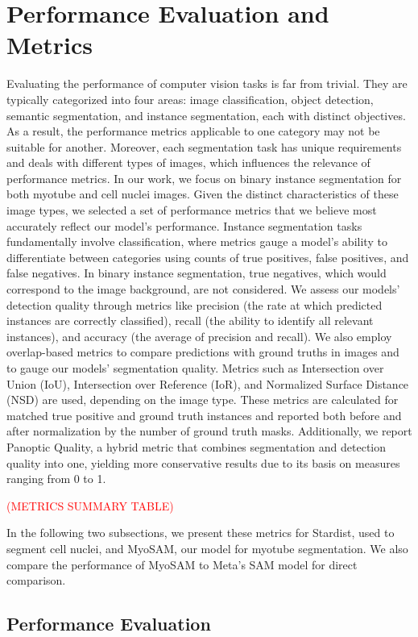 \section{Performance Evaluation and Metrics}
Evaluating the performance of computer vision tasks is far from trivial. They are typically categorized into four areas: image classification, object detection, semantic segmentation, and instance segmentation, each with distinct objectives. As a result, the performance metrics applicable to one category may not be suitable for another. Moreover, each segmentation task has unique requirements and deals with different types of images, which influences the relevance of performance metrics. In our work, we focus on binary instance segmentation for both myotube and cell nuclei images. Given the distinct characteristics of these image types, we selected a set of performance metrics that we believe most accurately reflect our model's performance.
Instance segmentation tasks fundamentally involve classification, where metrics gauge a model's ability to differentiate between categories using counts of true positives, false positives, and false negatives. In binary instance segmentation, true negatives, which would correspond to the image background, are not considered. We assess our models' detection quality through metrics like precision (the rate at which predicted instances are correctly classified), recall (the ability to identify all relevant instances), and accuracy (the average of precision and recall). We also employ overlap-based metrics to compare predictions with ground truths in images and to gauge our models' segmentation quality. Metrics such as Intersection over Union (IoU), Intersection over Reference (IoR), and Normalized Surface Distance (NSD) are used, depending on the image type. These metrics are calculated for matched true positive and ground truth instances and reported both before and after normalization by the number of ground truth masks. Additionally, we report Panoptic Quality, a hybrid metric that combines segmentation and detection quality into one, yielding more conservative results due to its basis on measures ranging from 0 to 1.

\textcolor{red}{(METRICS SUMMARY TABLE)}

In the following two subsections, we present these metrics for Stardist, used to segment cell nuclei, and MyoSAM, our model for myotube segmentation. We also compare the performance of MyoSAM to Meta’s SAM model for direct comparison.
\subsection{Performance Evaluation}
